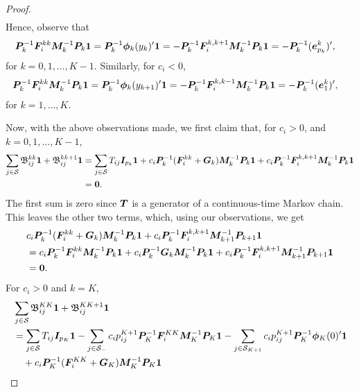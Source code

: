 \begin{proof}
\begin{align*}
	\end{align*}
	Hence, observe that 
	\begin{align*}
		&\boldsymbol P_k^{-1}\boldsymbol F_i^{kk} \boldsymbol M_k^{-1} \boldsymbol P_k \boldsymbol 1 = \boldsymbol P_k^{-1} \boldsymbol \phi_k(y_k)'\boldsymbol 1 = -\boldsymbol P_k^{-1}\boldsymbol F_i^{k,k+1} \boldsymbol M_k^{-1} \boldsymbol P_k \boldsymbol 1 = - \boldsymbol P_k^{-1}(\boldsymbol e_{p_k}^k)',
	\end{align*}
	for \(k=0,1,\dots,K-1\). 
	Similarly, for \(c_i<0\), 
	\begin{align*}
		&\boldsymbol P_k^{-1}\boldsymbol F_i^{kk} \boldsymbol M_k^{-1} \boldsymbol P_k \boldsymbol 1 = \boldsymbol P_k^{-1} \boldsymbol \phi_k(y_{k+1})'\boldsymbol 1 = -\boldsymbol P_k^{-1}\boldsymbol F_i^{k,k-1} \boldsymbol M_k^{-1} \boldsymbol P_k \boldsymbol 1 = - \boldsymbol P_k^{-1}(\boldsymbol e_{1}^k)',
	\end{align*}
	for \(k=1,\dots,K\). 

	Now, with the above observations made, we first claim that, for \(c_i>0\), and \(k=0,1,...,K-1\), 
	\begin{align*}
		\sum_{j\in\mathcal{S}}\mathfrak{\boldsymbol B}^{kk}_{ij}\boldsymbol 1 + \mathfrak{\boldsymbol B}^{kk+1}_{ij}\boldsymbol 1
		&=\sum_{j\in\mathcal{S}}T_{ij}\boldsymbol I_{p_k}\boldsymbol 1 + c_i \boldsymbol P_k^{-1}(\boldsymbol F_i^{kk}+\boldsymbol G_k)\boldsymbol M_k^{-1}\boldsymbol P_k\boldsymbol 1 + c_i \boldsymbol P_k^{-1}\boldsymbol F_i^{k,k+1}\boldsymbol M_k^{-1}\boldsymbol P_k\boldsymbol 1 
		\\&=\boldsymbol 0.
	\end{align*}
	The first sum is zero since \(\boldsymbol T\) is a generator of a continuous-time Markov chain. This leaves the other two terms, which, using our observations, we get 
	\begin{align*}
		& c_i \boldsymbol P_k^{-1}(\boldsymbol F_i^{kk}+\boldsymbol G_k)\boldsymbol M_k^{-1}\boldsymbol P_k\boldsymbol 1 + c_i \boldsymbol P_k^{-1}\boldsymbol F_i^{k,k+1}\boldsymbol M_{k+1}^{-1}\boldsymbol P_{k+1}\boldsymbol 1
		\\&= c_i \boldsymbol P_k^{-1}\boldsymbol F_i^{kk} \boldsymbol M_k^{-1}\boldsymbol P_k\boldsymbol 1 + c_i \boldsymbol P_k^{-1}\boldsymbol G_k\boldsymbol M_k^{-1}\boldsymbol P_k\boldsymbol 1 + c_i \boldsymbol P_k^{-1}\boldsymbol F_i^{k,k+1}\boldsymbol M_{k+1}^{-1}\boldsymbol P_{k+1}\boldsymbol 1 
		\\&= \boldsymbol 0.
	\end{align*}
	For \(c_i>0\) and \(k=K\), 
	\begin{align*}
		&\sum_{j\in\calS}\mathfrak{\bs B}^{KK}_{ij}\bs 1 + \mathfrak{\bs B}^{K{K+1}}_{ij}\bs 1
		\\&= \sum_{j\in\calS}T_{ij}\bs I_{p_K}\bs 1-\sum_{j\in\calS_-} c_ip_{ij}^{K+1} \bs P_K^{-1}\bs F_i^{KK}\bs M_K^{-1}\bs P_K \bs 1 -\sum_{j\in\calS_{{K+1} }}c_ip_{ij}^{K+1} \bs P_K^{-1}\boldsymbol \phi_K(0)\tr{}\bs 1 
		\\&\quad{} + c_i \bs P_K^{-1}(\bs F_i^{KK}+\bs G_K)\bs M_K^{-1}\bs P_K\boldsymbol 1 

\end{align*}
\end{proof}
